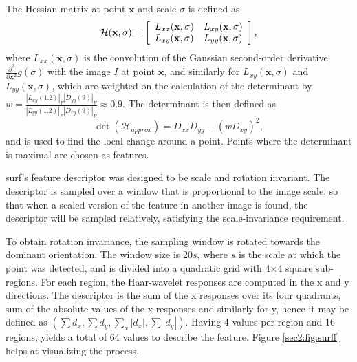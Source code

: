The Hessian matrix at point $\mathbf{x}$ and scale $\sigma$ is defined as
\begin{equation}
\label{sec2:eq:hessian}
\mathcal { H } ( \mathbf{x} , \sigma ) = \left[ \begin{array} { l l } { L _ { x x } ( \mathbf{x} , \sigma ) } & { L _ { x y } ( \mathbf{x} , \sigma ) } \\ { L _ { x y } ( \mathbf{x} , \sigma ) } & { L _ { y y } ( \mathbf{x} , \sigma ) } \end{array} \right],
\end{equation}
where $L_{xx}(\mathbf{x}, \sigma)$ is the convolution of the Gaussian second-order derivative $\frac { \partial ^ { 2 } } { \partial \mathbf{x} ^ { 2 } } g ( \sigma )$ with the image $I$ at point $\mathbf{x}$, and similarly for $L_{xy}(\mathbf{x}, \sigma)$ and $L_{yy}(\mathbf{x}, \sigma)$, which are weighted on the calculation of the determinant by $w = \frac { \left| L _ { x y } ( 1.2 ) \right| _ { F } \left| D _ { y y } ( 9 ) \right| _ { F } } { \left| L _ { y y } ( 1.2 ) \right| _ { F } \left| D _ { x y } ( 9 ) \right| _ { F } } \approx 0.9$.
The determinant is then defined as 
\begin{equation}
\label{sec2:eq:det}
\operatorname { det } \left( \mathcal { H } _ { a p p r o x } \right) = D _ { x x } D _ { y y } - \left( w D _ { x y } \right) ^ { 2 },
\end{equation}
and is used to find the local change around a point. Points where the determinant is maximal are chosen as features. 

\acrshort{surf}'s feature descriptor was designed to be scale and rotation invariant. The descriptor is sampled over a window that is proportional to the image scale, so that when a scaled version of the feature in another image is found, the descriptor will be sampled relatively, satisfying the scale-invariance requirement.

To obtain rotation invariance, the sampling window is rotated towards the dominant orientation. The window size is 20$s$, where $s$ is the scale at which the point was detected, and is divided into a quadratic grid with 4$\times$4 square sub-regions. For each region, the Haar-wavelet responses are computed in the x and y directions. The descriptor is the sum of the x responses over its four quadrants, sum of the absolute values of the x responses and similarly for y, hence it may be defined as $\left( \sum d _ { x } , \sum d _ { y } , \sum _ { x } \left| d _ { x } \right| , \sum \left| d _ { y } \right| \right)$. Having 4 values per region and 16 regions, yields a total of 64 values to describe the feature. Figure \ref{sec2:fig:surff} helps at visualizing the process.

